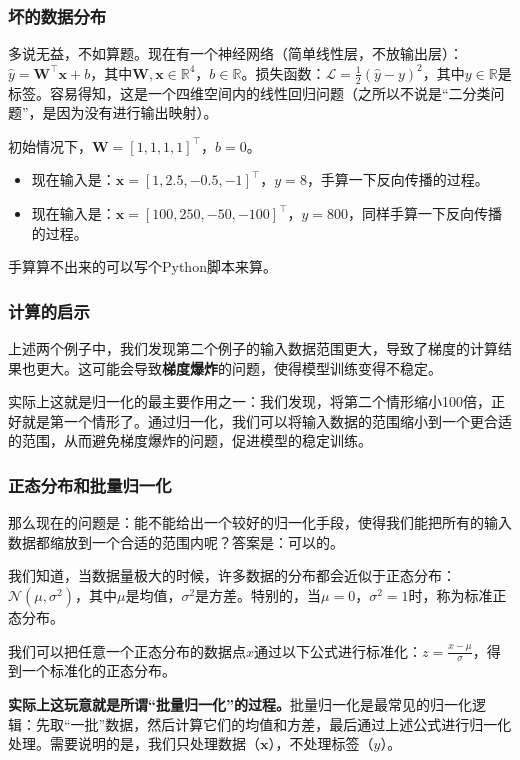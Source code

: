 \documentclass{ctexbeamer}
\begin{document}
\begin{frame}
    \frametitle{坏的数据分布}

    多说无益，不如算题。现在有一个神经网络（简单线性层，不放输出层）：$\hat{y} = \mathbf{W}^\top \mathbf{x} + b$，其中$\mathbf{W}, \mathbf{x} \in \mathbb{R}^{4}$，$b \in \mathbb{R}$。损失函数：$\mathcal{L} = \frac{1}{2}(\hat{y} - y)^2$，其中$y \in \mathbb{R}$是标签。容易得知，这是一个四维空间内的线性回归问题（之所以不说是“二分类问题”，是因为没有进行输出映射）。

    初始情况下，$\mathbf{W} = [1, 1, 1, 1]^\top$，$b = 0$。

    \begin{itemize}
        \item 现在输入是：$\mathbf{x} = [1, 2.5, -0.5, -1]^\top$，$y = 8$，手算一下反向传播的过程。
        \item 现在输入是：$\mathbf{x} = [100, 250, -50, -100]^\top$，$y = 800$，同样手算一下反向传播的过程。
    \end{itemize}
    手算算不出来的可以写个Python脚本来算。

\end{frame}

\begin{frame}
    \frametitle{计算的启示}

    上述两个例子中，我们发现第二个例子的输入数据范围更大，导致了梯度的计算结果也更大。这可能会导致\textbf{梯度爆炸}的问题，使得模型训练变得不稳定。

    实际上这就是归一化的最主要作用之一：我们发现，将第二个情形缩小100倍，正好就是第一个情形了。通过归一化，我们可以将输入数据的范围缩小到一个更合适的范围，从而避免梯度爆炸的问题，促进模型的稳定训练。

\end{frame}

\begin{frame}
    \frametitle{正态分布和批量归一化}

    那么现在的问题是：能不能给出一个较好的归一化手段，使得我们能把所有的输入数据都缩放到一个合适的范围内呢？答案是：可以的。

    我们知道，当数据量极大的时候，许多数据的分布都会近似于正态分布：$\mathcal{N}(\mu, \sigma^2)$，其中$\mu$是均值，$\sigma^2$是方差。特别的，当$\mu=0$，$\sigma^2=1$时，称为标准正态分布。
    
    我们可以把任意一个正态分布的数据点$x$通过以下公式进行标准化：$z = \frac{x - \mu}{\sigma}$，得到一个标准化的正态分布。

    \textbf{实际上这玩意就是所谓“批量归一化”的过程。}批量归一化是最常见的归一化逻辑：先取“一批”数据，然后计算它们的均值和方差，最后通过上述公式进行归一化处理。需要说明的是，我们只处理数据（$\mathbf{x}$），不处理标签（$y$）。

\end{frame}
\end{document}
